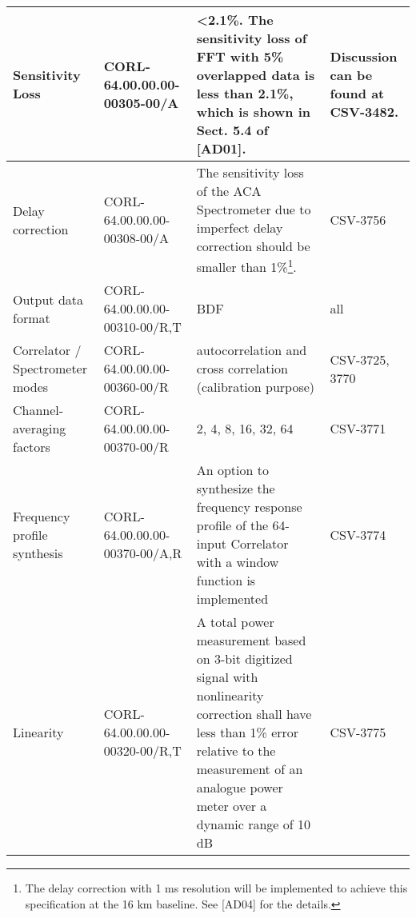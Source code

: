 \begin{longtable}{|p{3cm}|p{2cm}|p{6cm}|p{2cm}|}
Sensitivity Loss				  & CORL-64.00.00.00-00305-00/A					 & \textless{}2.1\%. The sensitivity loss of FFT with 5\% overlapped data is less than 2.1\%, which is shown in Sect. 5.4 of {[}AD01{]}.                                                                                         				& Discussion can be found at CSV-3482.				 		  \\ \hline
Delay correction				  &	CORL-64.00.00.00-00308-00/A					 & The sensitivity loss of the ACA Spectrometer due to imperfect delay correction should be smaller than 1\%\footnote{The delay correction with 1 ms resolution will be implemented to achieve this specification at the 16 km baseline. See {[}AD04{]} for the details.}.  & CSV-3756								  \\ \hline
Output data format                & CORL-64.00.00.00-00310-00/R,T                & BDF                                                                                                                                                                                                                                          & all                                                         \\ \hline
Correlator / Spectrometer modes   & CORL-64.00.00.00-00360-00/R                  & autocorrelation and cross correlation (calibration purpose)                                                                                                                                                                                  & CSV-3725, 3770                                                  \\ \hline
Channel-averaging factors         & CORL-64.00.00.00-00370-00/R                  & 2, 4, 8, 16, 32, 64                                                                                                                                                                                                                          & CSV-3771                                                           \\ \hline
Frequency profile  synthesis      & CORL-64.00.00.00-00370-00/A,R                & An option to synthesize the frequency response profile of the 64-input Correlator with a window function is implemented                                                                                                                      & CSV-3774                                                            \\ \hline
Linearity                         & CORL-64.00.00.00-00320-00/R,T                & A total power measurement based on 3-bit digitized signal with nonlinearity correction shall have less than 1\% error relative to the measurement of an analogue power meter over a dynamic range of 10 dB                                   & CSV-3775                                                        \\ \hline

\end{longtable}
